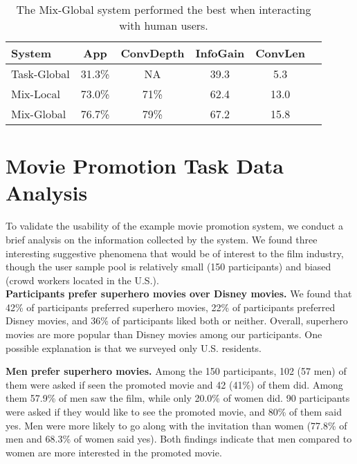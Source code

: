 \documentclass[11pt]{article}
\newcommand{\dk}[1]{{\color{red} #1}}
\begin{document}
\begin{table}[htbp]
    \centering
    \begin{tabular}{l|ccccc}
    \hline
         System&  App & ConvDepth & InfoGain & ConvLen\\
         \hline
         Task-Global &31.3\% & NA & 39.3 & 5.3\\
         \hline
         Mix-Local & 73.0\% & 71\% & 62.4 & 13.0\\
         \hline
         Mix-Global &76.7\% & 79\%  & 67.2 &15.8\\
         \hline
    \end{tabular}
    \caption{The Mix-Global system performed the best when interacting with human users. }
    \label{table: result1}
\end{table} 

\vspace{-2mm}
\section{Movie Promotion Task Data Analysis}
To validate the usability of the example movie promotion system, we conduct a brief analysis on the information collected by the system. We found three interesting suggestive phenomena that would be of interest to the film industry, though the user sample pool is relatively small (150 participants) and biased (crowd workers located in the U.S.). \\

\noindent\textbf{Participants prefer superhero movies over Disney movies.} %
We found that 42\% of participants preferred superhero movies, 22\% of participants preferred Disney movies, and 36\% of participants liked both or neither. Overall, superhero movies are more popular than Disney movies among our participants. One possible explanation is that we surveyed only U.S. residents.


\noindent\textbf{Men prefer superhero movies.} 
Among the 150 participants, 102 (57 men) of them were asked if seen the promoted movie and 42 (41\%) of them did. Among them 57.9\% of men saw the film, while only 20.0\% of women did. 90 participants were asked if they would like to see the promoted movie, and 80\% of them said yes. Men were more likely to go along with the invitation than women (77.8\% of men and 68.3\% of women said yes). Both findings indicate that men compared to women are more interested in the promoted movie. \\%
\end{document}
